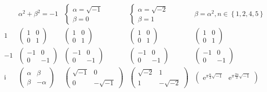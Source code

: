\documentclass[
]{book}
\theoremstyle{definition}
\theoremstyle{definition}
\theoremstyle{definition}
\theoremstyle{definition}
\theoremstyle{remark}
\begin{document}
\[
\begin{array}{ccccc}
 & \alpha^{2}+\beta^{2}=-1 & \begin{cases}
\alpha=\sqrt{-1}\\
\beta=0
\end{cases} & \begin{cases}
\alpha=\sqrt{-2}\\
\beta=1
\end{cases} & \beta=\alpha^{2},n\in\left\{ 1,2,4,5\right\} \\
1 & \begin{pmatrix}1 & 0\\
0 & 1
\end{pmatrix} & \begin{pmatrix}1 & 0\\
0 & 1
\end{pmatrix} & \begin{pmatrix}1 & 0\\
0 & 1
\end{pmatrix} & \begin{pmatrix}1 & 0\\
0 & 1
\end{pmatrix}\\
-1 & \begin{pmatrix}-1 & 0\\
0 & -1
\end{pmatrix} & \begin{pmatrix}-1 & 0\\
0 & -1
\end{pmatrix} & \begin{pmatrix}-1 & 0\\
0 & -1
\end{pmatrix} & \begin{pmatrix}-1 & 0\\
0 & -1
\end{pmatrix}\\
\mathrm{i} & \begin{pmatrix}\alpha & \beta\\
\beta & -\alpha
\end{pmatrix} & \begin{pmatrix}\sqrt{-1} & 0\\
0 & -\sqrt{-1}
\end{pmatrix} & \begin{pmatrix}\sqrt{-2} & 1\\
1 & -\sqrt{-2}
\end{pmatrix} & \begin{pmatrix}\mathrm{e}^{\pi\frac{n}{3}\sqrt{-1}} & \mathrm{e}^{\pi\frac{2n}{3}\sqrt{-1}}\\

\end{pmatrix}
\end{array}\]
\end{document}
